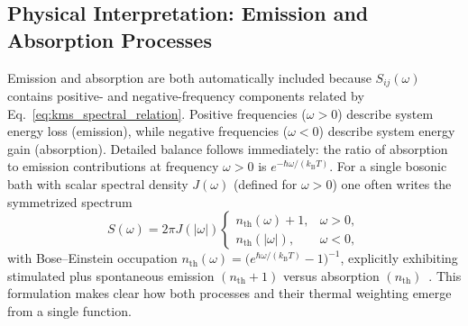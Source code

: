 \subsection{Physical Interpretation: Emission and Absorption Processes}
\label{subsec:physical_emission_absorption}

Emission and absorption are both automatically included because $S_{ij}(\omega)$ contains positive- and negative-frequency components related by Eq.~\eqref{eq:kms_spectral_relation}. Positive frequencies ($\omega>0$) describe system energy loss (emission), while negative frequencies ($\omega<0$) describe system energy gain (absorption). Detailed balance follows immediately: the ratio of absorption to emission contributions at frequency $\omega>0$ is $e^{-\hbar \omega/(k_{\mathrm{B}}T)}$. For a single bosonic bath with scalar spectral density $J(\omega)$ (defined for $\omega>0$) one often writes the symmetrized spectrum
\begin{equation}
S(\omega) = 2\pi J(|\omega|) \begin{cases} n_{\text{th}}(\omega)+1, & \omega>0, \\ n_{\text{th}}(|\omega|), & \omega<0, \end{cases}
\label{eq:bose_symmetric_spectrum}
\end{equation}
with Bose--Einstein occupation $n_{\text{th}}(\omega) = \big(e^{\hbar\omega/(k_{\mathrm{B}}T)}-1\big)^{-1}$, explicitly exhibiting stimulated plus spontaneous emission $(n_{\text{th}}+1)$ versus absorption $(n_{\text{th}})$~\cite{weiss2012quantumdissipativesystems}. This formulation makes clear how both processes and their thermal weighting emerge from a single function.
